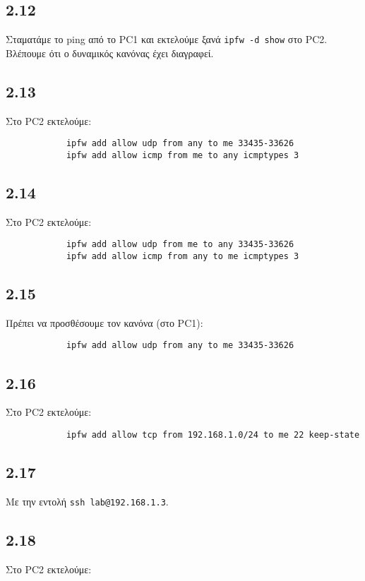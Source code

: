 \documentclass[a4paper, 12pt]{article}
\begin{document}
	\subsection*{2.12}
		Σταματάμε το ping από το PC1 και εκτελούμε ξανά \verb|ipfw -d show| στο PC2. Βλέπουμε ότι ο δυναμικός κανόνας έχει διαγραφεί.

	\subsection*{2.13} 
		Στο PC2 εκτελούμε:
		
		\begin{verbatim}
			ipfw add allow udp from any to me 33435-33626 
			ipfw add allow icmp from me to any icmptypes 3
		\end{verbatim}

	\subsection*{2.14}
		Στο PC2 εκτελούμε:
		
		\begin{verbatim}
			ipfw add allow udp from me to any 33435-33626
			ipfw add allow icmp from any to me icmptypes 3
		\end{verbatim}

	\subsection*{2.15}
		Πρέπει να προσθέσουμε τον κανόνα (στο PC1):
		
		\begin{verbatim}
			ipfw add allow udp from any to me 33435-33626
		\end{verbatim}

	\subsection*{2.16}
		Στο PC2 εκτελούμε:
		
		\begin{verbatim}
			ipfw add allow tcp from 192.168.1.0/24 to me 22 keep-state
		\end{verbatim}

	\subsection*{2.17}
		Με την εντολή \verb|ssh lab@192.168.1.3|.

	\subsection*{2.18}
		Στο PC2 εκτελούμε:
		
\end{document}
